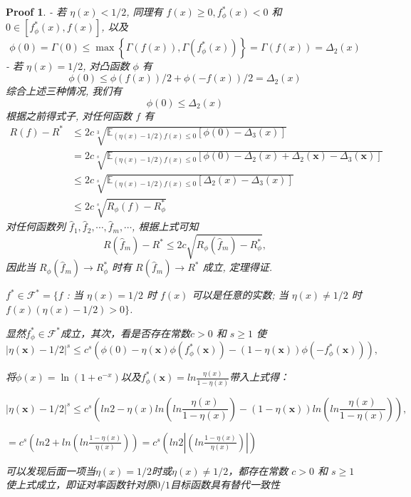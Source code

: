\documentclass[a4paper,UTF8]{article}
\numberwithin{equation}{section}
\newtheorem*{myProof}{Proof}
\begin{document}
\begin{myProof}
		- 若 $\eta(x)<1 / 2$, 同理有 $f(x) \geqslant 0, f_{\phi}^{*}(x)<0$ 和 $0 \in\left[f_{\phi}^{*}(x), f(x)\right]$, 以及
		$$
		\phi(0)=\Gamma(0) \leqslant \max \left\{\Gamma(f(x)), \Gamma\left(f_{\phi}^{*}(x)\right)\right\}=\Gamma(f(x))=\Delta_{2}(x)
		$$
		- 若 $\eta(x)=1 / 2$, 对凸函数 $\phi$ 有
		$$
		\phi(0) \leqslant \phi(f(x)) / 2+\phi(-f(x)) / 2=\Delta_{2}(x)
		$$
		综合上述三种情况, 我们有
		$$
		\phi(0) \leqslant \Delta_{2}(x)
		$$
		根据之前得式子, 对任何函数 $f$ 有
		$$
		\begin{aligned}
			R(f)-R^{*} & \leqslant 2 c \sqrt[3]{\mathbb{E}_{(\eta(x)-1 / 2) f(x) \leqslant 0}\left[\phi(0)-\Delta_{3}(x)\right]} \\
			&=2 c \sqrt[s]{\mathbb{E}_{(\eta(x)-1 / 2) f(x) \leqslant 0}\left[\phi(0)-\Delta_{2}(x)+\Delta_{2}(\boldsymbol{x})-\Delta_{3}(\boldsymbol{x})\right]} \\
			& \leqslant 2 c \sqrt[s]{\mathbb{E}_{(\eta(x)-1 / 2) f(x) \leqslant 0}\left[\Delta_{2}(x)-\Delta_{3}(x)\right]} \\
			& \leqslant 2 c \sqrt[s]{R_{\phi}(f)-R_{\phi}^{*}}
		\end{aligned}
		$$
		对任何函数列 $\hat{f}_{1}, \hat{f}_{2}, \cdots, \hat{f}_{m}, \cdots$, 根据上式可知
		$$
		R\left(\hat{f}_{m}\right)-R^{*} \leqslant 2 c \sqrt{R_{\phi}\left(\hat{f}_{m}\right)-R_{\phi}^{*}},
		$$
		因此当 $R_{\phi}\left(\hat{f}_{m}\right) \rightarrow R_{\phi}^{*}$ 时有 $R\left(\hat{f}_{m}\right) \rightarrow R^{*}$ 成立, 定理得证.
		
		
		
		
		$f^{*} \in \mathcal{F}^{*}=\{f$ : 当 $\eta(x)=1 / 2$ 时 $f(x)$ 可以是任意的实数; 当 $\eta(x) \neq 1 / 2$ 时 $f(x)(\eta(x)-1 / 2)>0\}$.
		
		显然$f_{\phi}^{*} \in \mathcal{F}^{*}$成立，其次，看是否存在常数$c>0$ 和 $s \geqslant 1$ 使
		$$
		|\eta(\boldsymbol{x})-1 / 2|^{s} \leqslant c^{s}\left(\phi(0)-\eta(\boldsymbol{x}) \phi\left(f_{\phi}^{*}(\boldsymbol{x})\right)-(1-\eta(\boldsymbol{x})) \phi\left(-f_{\phi}^{*}(\boldsymbol{x})\right)\right),
		$$
		
		将$\phi(x) = \ln \left( 1 + \mathrm{e}^{-x} \right)$以及$f_{\phi}^{*}(\boldsymbol{x})  = ln\frac{\eta(x)}{1-\eta(x)}$带入上式得：
		
		$$
		|\eta(\boldsymbol{x})-1 / 2|^{s} \leqslant c^{s}\left(ln2-\eta(x)ln(ln\frac{\eta(x)}{1-\eta(x)}) -(1-\eta(\boldsymbol{x})) ln(ln\frac{\eta(x)}{1-\eta(x)})\right),
		$$
		
		$=c^{s}\left(ln2 + ln(ln\frac{1-\eta(x)}{\eta(x)})\right)= c^{s}\left(ln2|(ln\frac{1-\eta(x)}{\eta(x)})|\right)$
		
		可以发现后面一项当$\eta(x) = 1/2$时或$\eta(x) \ne  1/2$，都存在常数 $c>0$ 和 $s \geqslant 1$ 使上式成立，即证对率函数针对原$0/1$目标函数具有替代一致性
		
		
	\end{myProof}
	
\end{document}
